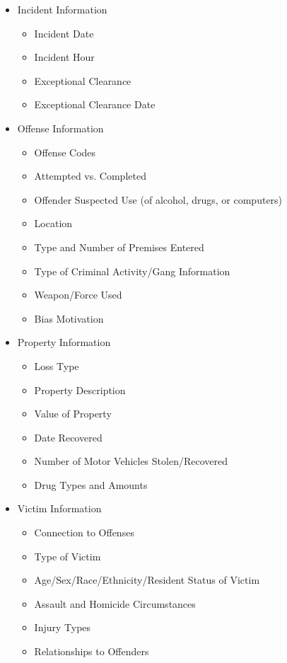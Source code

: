 \documentclass[letterpaper, 10 pt, conference]{ieeeconf}  %
\begin{document}
\begin{itemize}
    \item Incident Information
    \begin{itemize}
        \item Incident Date
        \item Incident Hour
        \item Exceptional Clearance
        \item Exceptional Clearance Date
    \end{itemize}
    \item Offense Information
        \begin{itemize}
        \item Offense Codes
        \item Attempted vs. Completed
        \item Offender Suspected Use (of alcohol, drugs, or computers)
        \item Location
        \item Type and Number of Premises Entered
        \item Type of Criminal Activity/Gang Information
        \item Weapon/Force Used
        \item Bias Motivation
    \end{itemize}
    \item Property Information
    \begin{itemize}
        \item Loss Type
        \item Property Description
        \item Value of Property
        \item Date Recovered
        \item Number of Motor Vehicles Stolen/Recovered
        \item Drug Types and Amounts
    \end{itemize}
    \item Victim Information
    \begin{itemize}
        \item Connection to Offenses
        \item Type of Victim
        \item Age/Sex/Race/Ethnicity/Resident Status of Victim
        \item Assault and Homicide Circumstances
        \item Injury Types
        \item Relationships to Offenders

\end{itemize}
\end{itemize}
\end{document}
